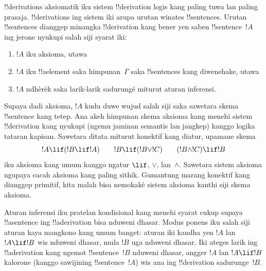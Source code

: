 \documentclass[../../../include/open-logic-section]{subfiles}
\begin{document}
      {}
      {}


!!{derivation}s aksiomatik iku sistem !!{derivation} logis kang paling
tuwa lan paling prasaja. !!{derivation}s ing sistem iki arupa
urutan winates !!{sentence}s. Urutan !!{sentence}s dianggep minangka
!!{derivation} kang bener yen saben !!{sentence}~$!A$ ing jerone
nyukupi salah siji syarat iki:
\begin{enumerate}
\item $!A$ iku aksioma, utawa
\item $!A$ iku !!a{element} saka himpunan~$\Gamma$ saka !!{sentence}s
  kang diwenehake, utawa
\item $!A$ ndhèrèk saka larik-larik sadurungé miturut aturan inferensi.
\end{enumerate}
Supaya dadi aksioma, $!A$ kudu duwe wujud salah siji saka sawetara
skema !!{sentence} kang tetep. Ana akeh himpunan skema aksioma kang
menehi sistem !!{derivation} kang nyukupi (ngemu jaminan semantis lan
jangkep) kanggo
logika tataran kapisan. Sawetara ditata miturut konektif kang diatur,
upamane skema
\[
!A \lif (!B \lif !A) \qquad !B \lif (!B \lor !C) \qquad (!B \land !C) \lif !B
\]
iku aksioma kang umum kanggo ngatur $\lif$, $\lor$, lan~$\land$.
Sawetara sistem aksioma ngupaya cacah aksioma kang paling sithik.
Gumantung marang konektif kang dianggep primitif, kita malah bisa
nemokaké sistem aksioma kanthi siji skema aksioma.

Aturan inferensi iku pratelan kondisional kang menehi syarat cukup
supaya !!a{sentence} ing !!a{derivation} bisa nduweni dhasar. Modus ponens
iku salah siji aturan kaya mangkono kang umum banget: aturan iki kandha
yen $!A$ lan $!A \lif !B$ wis nduweni dhasar, mula $!B$ uga nduweni
dhasar. Iki
ateges larik ing !!a{derivation} kang ngemot !!{sentence}~$!B$
nduweni dhasar, angger $!A$ lan $!A \lif !B$ kalorone (kanggo sawijining
!!{sentence}~$!A$) wis ana ing !!{derivation} sadurunge~$!B$.
\end{document}
